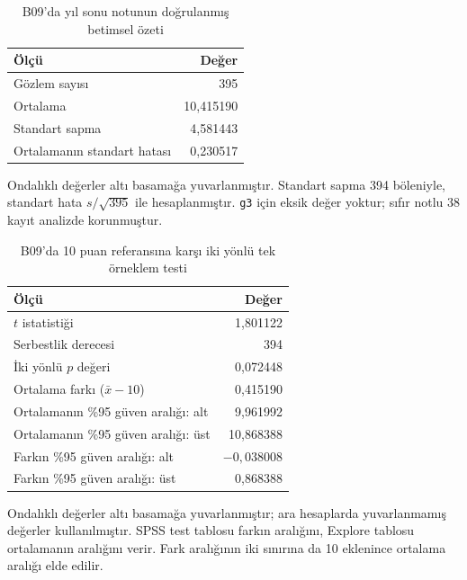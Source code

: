 \begin{table}[H]
\centering
\caption{B09'da yıl sonu notunun doğrulanmış betimsel özeti}
\label{tab:b09-dogrulanmis-betimsel}
\begin{tabular}{@{}lr@{}}
\toprule
Ölçü & Değer \\
\midrule
Gözlem sayısı & 395 \\
Ortalama & 10,415190 \\
Standart sapma & 4,581443 \\
Ortalamanın standart hatası & 0,230517 \\
\bottomrule
\end{tabular}
\par\smallskip
{\footnotesize Ondalıklı değerler altı basamağa yuvarlanmıştır.
Standart sapma 394 böleniyle, standart hata $s/\sqrt{395}$ ile
hesaplanmıştır. \texttt{g3} için eksik değer yoktur; sıfır notlu
38 kayıt analizde korunmuştur.\par}
\end{table}

\begin{table}[H]
\centering
\caption{B09'da 10 puan referansına karşı iki yönlü tek örneklem testi}
\label{tab:b09-dogrulanmis-test}
\begin{tabular}{@{}lr@{}}
\toprule
Ölçü & Değer \\
\midrule
$t$ istatistiği & 1,801122 \\
Serbestlik derecesi & 394 \\
İki yönlü $p$ değeri & 0,072448 \\
Ortalama farkı ($\bar x-10$) & 0,415190 \\
Ortalamanın \%95 güven aralığı: alt & 9,961992 \\
Ortalamanın \%95 güven aralığı: üst & 10,868388 \\
Farkın \%95 güven aralığı: alt & $-0{,}038008$ \\
Farkın \%95 güven aralığı: üst & 0,868388 \\
\bottomrule
\end{tabular}
\par\smallskip
{\footnotesize Ondalıklı değerler altı basamağa yuvarlanmıştır;
ara hesaplarda yuvarlanmamış değerler kullanılmıştır. SPSS test
tablosu farkın aralığını, Explore tablosu ortalamanın aralığını
verir. Fark aralığının iki sınırına da 10 eklenince ortalama
aralığı elde edilir.\par}
\end{table}

